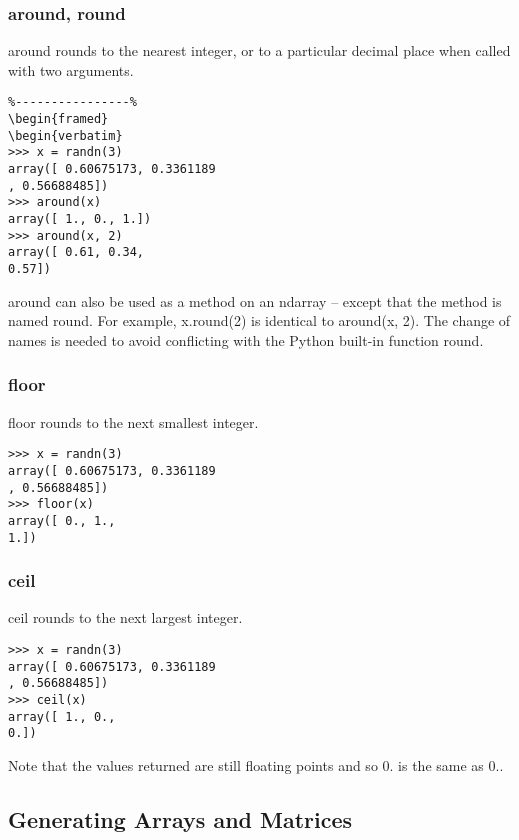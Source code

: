 \documentclass[KSmain.tex]{subfiles}
\begin{document}
\subsubsection*{around, round}
around rounds to the nearest integer, or to a particular decimal place when called with two arguments.
\begin{framed}
\begin{verbatim}
%----------------%
\begin{framed}
\begin{verbatim}
>>> x = randn(3)
array([ 0.60675173, 0.3361189
, 0.56688485])
>>> around(x)
array([ 1., 0., 1.])
>>> around(x, 2)
array([ 0.61, 0.34,
0.57])
\end{verbatim}
\end{framed}
around can also be used as a method on an ndarray – except that the method is named round. For example,
x.round(2) is identical to around(x, 2). The change of names is needed to avoid conflicting with the
Python built-in function round.
\subsubsection*{floor}
floor rounds to the next smallest integer.
\begin{framed}
\begin{verbatim}
>>> x = randn(3)
array([ 0.60675173, 0.3361189
, 0.56688485])
>>> floor(x)
array([ 0., 1.,
1.])
\end{verbatim}
\end{framed}
\subsubsection*{ceil}
ceil rounds to the next largest integer.
\begin{framed}
\begin{verbatim}
>>> x = randn(3)
array([ 0.60675173, 0.3361189
, 0.56688485])
>>> ceil(x)
array([ 1., 0.,
0.])
\end{verbatim}
\end{framed}
Note that the values returned are still floating points and so 0.
is the same as 0..



\subsection{Generating Arrays and Matrices}
\end{document}
